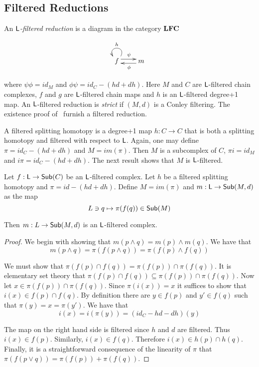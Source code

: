 \subsection{Filtered Reductions}
 
An {\em ${\mathsf L}$-filtered reduction} is a diagram in the category ${\bf LFC}$ 

\[
\xymatrixrowsep{0.03in}
\xymatrixcolsep{0.3in}
\xymatrix{
f \ar@(ur,ul)_{h}  \ar[r]<3pt>^{\psi} & \ar[l]<3pt>^{\phi} m
}
\]

where $\psi\phi = id_M$ and $\phi\psi = id_C-(hd+dh)$.  Here  $M$ and $C$ are ${\mathsf L}$-filtered chain complexes, $f$ and $g$ are ${\mathsf L}$-filtered chain maps and $h$ is an ${\mathsf L}$-filtered degree+1 map.  An ${\mathsf L}$-filtered reduction is {\em strict} if $(M,d)$ is a Conley filtering.  The existence proof of~\cite{salamon}  furnish a filtered reduction.  

A filtered splitting homotopy is a degree+1 map $h:C\to C$ that is both a splitting homotopy and filtered with respect to ${\mathsf L}$.  Again, one may define $\pi=id_C-(hd+dh)$ and $M=im(\pi)$.  Then $M$ is a subcomplex of $C$, $\pi i = id_M$ and $i\pi = id_C-(hd+dh)$.  The next result shows that $M$ is ${\mathsf L}$-filtered. 

\begin{prop}\label{prop:filt:contract}
Let $f:{\mathsf L}\to \mathsf{Sub}(C)$ be an ${\mathsf L}$-filtered complex.  Let $h$ be a filtered splitting homotopy and $\pi = id-(hd+dh)$.  Define $M=im(\pi)$ and $m:{\mathsf L}\to \mathsf{Sub}(M,d)$ as the map $$L\ni q\mapsto  \pi(f(q))\in \mathsf{Sub}(M)$$

Then $m:L\to \mathsf{Sub}(M,d)$ is an ${\mathsf L}$-filtered complex.
\end{prop}
\begin{proof}
We begin with showing that $m(p \wedge q) = m(p)\wedge m(q)$.  We have that $$m(p\wedge q) = \pi(f(p\wedge q)) = \pi(f(p)\wedge f(q))$$

We must show that $\pi(f(p)\cap f(q)) = \pi(f(p))\cap \pi(f(q))$.  It is elementary set theory that $\pi(f(p)\cap f(q))\subseteq \pi(f(p))\cap \pi(f(q))$.  Now let $x\in \pi(f(p))\cap \pi(f(q))$.  Since $\pi(i(x))=x$ it suffices to show that $i(x)\in f(p)\cap f(q)$.  By definition there are $y\in f(p)$ and $y'\in f(q)$ such that $\pi(y) = x = \pi(y')$.  We have that $$i(x) = i(\pi(y)) = (id_C-hd - dh)(y)$$

The map on the right hand side is filtered since $h$ and $d$ are filtered.  Thus $i(x)\in f(p)$.  Similarly, $i(x)\in f(q)$.  Therefore $i(x)\in h(p)\cap h(q)$.  Finally, it is a straightforward consequence of the linearity of $\pi$ that $\pi(f(p\vee q)) = \pi(f(p))+\pi(f(q))$.


\end{proof}

